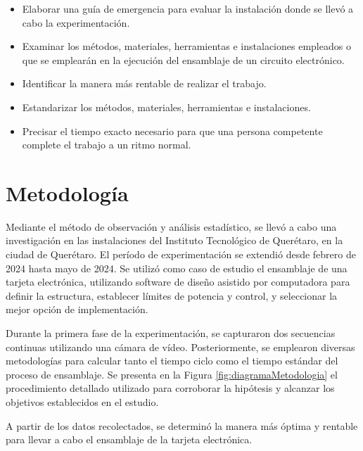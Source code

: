     \begin{itemize}
    \item Elaborar una guía de emergencia para evaluar la instalación donde se llevó a cabo la experimentación.
    \item Examinar los métodos, materiales, herramientas e instalaciones empleados o que se emplearán en la ejecución del ensamblaje de un circuito electrónico.
    \item Identificar la manera más rentable de realizar el trabajo.
    \item Estandarizar los métodos, materiales, herramientas e instalaciones.
    \item Precisar el tiempo exacto necesario para que una persona competente complete el trabajo a un ritmo normal.
    \end{itemize}
    \section{Metodología}
    Mediante el método de observación y análisis estadístico, se llevó a cabo una investigación en las instalaciones del Instituto Tecnológico de Querétaro, en la ciudad de Querétaro. El período de experimentación se extendió desde febrero de 2024 hasta mayo de 2024. Se utilizó como caso de estudio el ensamblaje de una tarjeta electrónica, utilizando software de diseño asistido por computadora para definir la estructura, establecer límites de potencia y control, y seleccionar la mejor opción de implementación.
    
    Durante la primera fase de la experimentación, se capturaron dos secuencias continuas utilizando una cámara de vídeo. Posteriormente, se emplearon diversas metodologías para calcular tanto el tiempo ciclo como el tiempo estándar del proceso de ensamblaje. Se presenta en la Figura \ref{fig:diagramaMetodologia} el procedimiento detallado utilizado para corroborar la hipótesis y alcanzar los objetivos establecidos en el estudio.
    
    A partir de los datos recolectados, se determinó la manera más óptima y rentable para llevar a cabo el ensamblaje de la tarjeta electrónica.
    
